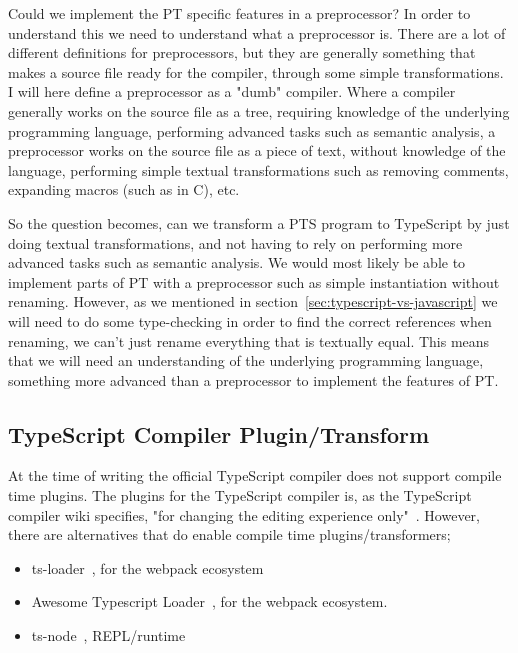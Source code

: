 Could we implement the PT specific features in a preprocessor?
In order to understand this we need to understand what a preprocessor is.
There are a lot of different definitions for preprocessors, but they are generally something that makes a source file ready for the compiler, through some simple transformations.
I will here define a preprocessor as a "dumb" compiler.
Where a compiler generally works on the source file as a tree, requiring knowledge of the underlying programming language, performing advanced tasks such as semantic analysis, a preprocessor works on the source file as a piece of text, without knowledge of the language, performing simple textual transformations such as removing comments, expanding macros (such as  in C), etc.

So the question becomes, can we transform a PTS program to TypeScript by just doing textual transformations, and not having to rely on performing more advanced tasks such as semantic analysis.
We would most likely be able to implement parts of PT with a preprocessor such as simple instantiation without renaming.
However, as we mentioned in section~\vref{sec:typescript-vs-javascript} we will need to do some type-checking in order to find the correct references when renaming, we can't just rename everything that is textually equal.
This means that we will need an understanding of the underlying programming language, something more advanced than a preprocessor to implement the features of PT\@.

\subsection{TypeScript Compiler Plugin/Transform}\label{subsec:typescript-compiler-plugin}

At the time of writing the official TypeScript compiler does not support compile time plugins.
The plugins for the TypeScript compiler is, as the TypeScript compiler wiki specifies, "for changing the editing experience only"~\cite{tscplugin}.
However, there are alternatives that do enable compile time plugins/transformers;

\begin{itemize}
    \item ts-loader~\cite{tsloadergithub}, for the webpack ecosystem
    \item Awesome Typescript Loader~\cite{awesometypescriptloadergithub}, for the webpack ecosystem.
    \item ts-node~\cite{tsnodegithub}, REPL/runtime
\end{itemize}

